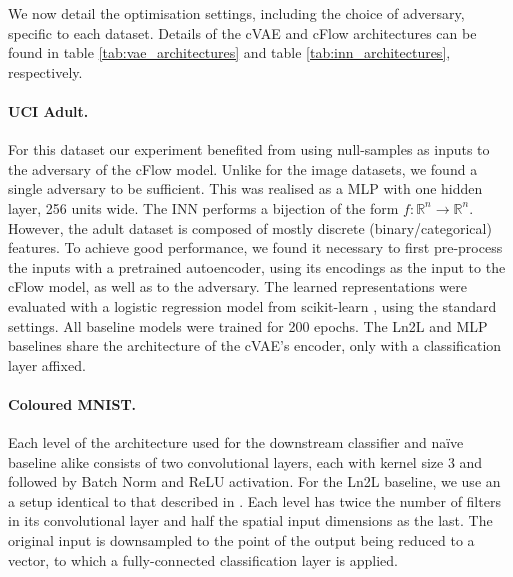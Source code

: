 We now detail the optimisation settings, including the choice of adversary, specific to each
dataset.
%
Details of the \ac{cVAE} and \ac{cFlow} architectures can be found in table \ref{tab:vae_architectures} and
table \ref{tab:inn_architectures}, respectively.

\paragraph{UCI Adult.}
%
For this dataset our experiment benefited from using null-samples as inputs to the adversary of the
\ac{cFlow} model. 
%
Unlike for the image datasets, we found a single adversary to be sufficient. 
%
This was realised as a \acf{MLP} with one hidden layer, 256 units wide. 
%
The \ac{INN} performs a bijection of the form $f: \mathbb{R}^n \rightarrow \mathbb{R}^n$. 
%
However, the adult dataset is composed of mostly discrete (binary/categorical) features. 
%
To achieve good performance, we found it necessary to first pre-process the inputs with a
pretrained autoencoder, using its encodings as the input to the \ac{cFlow} model, as well as to the
adversary. 
%
The learned representations were evaluated with a logistic regression model from scikit-learn
\citep{scikit-learn}, using the standard settings. 
%
All baseline models were trained for 200 epochs. 
%
The Ln2L \citep{kim2019learning} and \ac{MLP} baselines share the architecture of the \ac{cVAE}'s
encoder, only with a classification layer affixed.

\paragraph{Coloured MNIST.} Each level of the architecture used for the downstream classifier and
na\"ive baseline alike consists of two convolutional layers, each with kernel size 3 and followed
by Batch Norm \citep{ioffe2015batch} and ReLU activation. 
%
For the Ln2L baseline, we use an a setup identical to that described in \citet{kim2019learning}. 
%
Each level has twice the number of filters in its convolutional layer and half the spatial input
dimensions as the last. 
%
The original input is downsampled to the point of the output being reduced to a vector, to which a
fully-connected classification layer is applied.

